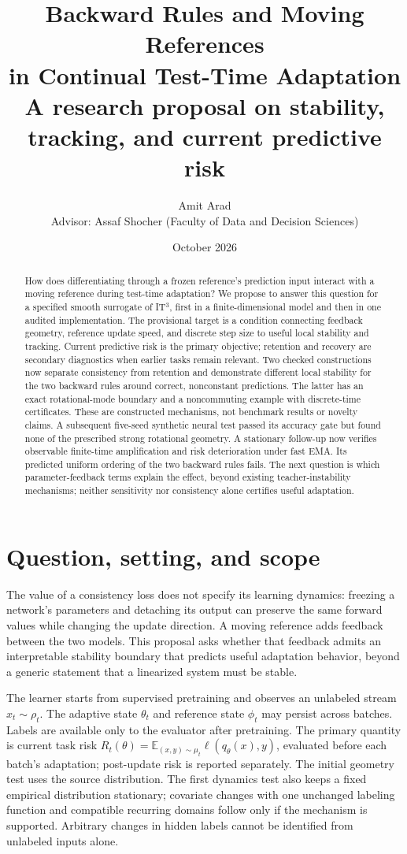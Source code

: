 \documentclass[11pt,a4paper]{article}
\title{Backward Rules and Moving References\\in Continual Test-Time Adaptation\\[0.4em]
\large A research proposal on stability, tracking, and current predictive risk}
\author{Amit Arad\\[0.3em]
\small Advisor: Assaf Shocher (Faculty of Data and Decision Sciences)}
\date{October 2026}
\newcommand{\E}{\mathbb{E}}
\begin{document}
\maketitle
\begin{abstract}
How does differentiating through a frozen reference's prediction input
interact with a moving reference during test-time adaptation? We propose
to answer this question for a specified smooth surrogate of IT$^3$, first
in a finite-dimensional model and then in one audited implementation.
The provisional target is a condition connecting feedback geometry,
reference update speed, and discrete step size to useful local stability
and tracking. Current predictive risk is the primary objective; retention
and recovery are secondary diagnostics when earlier tasks remain relevant.
Two checked constructions now separate consistency from retention and
demonstrate different local stability for the two backward rules around
correct, nonconstant predictions. The latter has an exact rotational-mode
boundary and a noncommuting example with discrete-time certificates.
These are constructed mechanisms, not benchmark results or novelty
claims. A subsequent five-seed synthetic neural test passed its accuracy
gate but found none of the prescribed strong rotational geometry. A
stationary follow-up now verifies observable finite-time amplification and
risk deterioration under fast EMA. Its predicted uniform ordering of the
two backward rules fails. The next question is which parameter-feedback
terms explain the effect, beyond existing teacher-instability mechanisms;
neither sensitivity nor consistency alone certifies useful adaptation.
\end{abstract}

\section{Question, setting, and scope}
The value of a consistency loss does not specify its learning dynamics:
freezing a network's parameters and detaching its output can preserve the
same forward values while changing the update direction. A moving reference
adds feedback between the two models. This proposal asks whether that
feedback admits an interpretable stability boundary that predicts useful
adaptation behavior, beyond a generic statement that a linearized system
must be stable.

The learner starts from supervised pretraining and observes an unlabeled
stream $x_t\sim\rho_t$. The adaptive state $\theta_t$ and reference state
$\phi_t$ may persist across batches. Labels are available only to the
evaluator after pretraining. The primary quantity is current task risk
$R_t(\theta)=\E_{(x,y)\sim\mu_t}\ell(q_\theta(x),y)$, evaluated before each
batch's adaptation; post-update risk is reported separately. The initial geometry test uses the source distribution. The first dynamics
test also keeps a fixed empirical distribution stationary; covariate changes with one
unchanged labeling function and compatible recurring domains follow only
if the mechanism is supported. Arbitrary changes in hidden
labels cannot be identified from unlabeled inputs alone.
\end{document}
